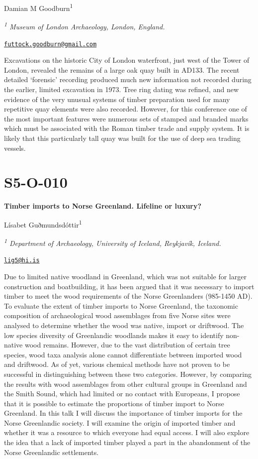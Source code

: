 \documentclass[
]{book}
\begin{document}
Damian M Goodburn\textsuperscript{1}

\emph{\textsuperscript{1} Museum of London Archaeology, London, England.}

\href{mailto:futtock.goodburn@gmail.com}{\nolinkurl{futtock.goodburn@gmail.com}}

Excavations on the historic City of London waterfront, just west of the Tower of London, revealed the remains of a large oak quay built in AD133. The recent detailed `forensic' recording produced much new information not recorded during the earlier, limited excavation in 1973. Tree ring dating was refined, and new evidence of the very unusual systems of timber preparation used for many repetitive quay elements were also recorded. However, for this conference one of the most important features were numerous sets of stamped and branded marks which must be associated with the Roman timber trade and supply system. It is likely that this particularly tall quay was built for the use of deep sea trading vessels.

\hypertarget{s5-o-010}{%
\section*{S5-O-010}\label{s5-o-010}}

\textbf{Timber imports to Norse Greenland. Lifeline or luxury?}

Lísabet Guðmundsdóttir\textsuperscript{1}

\emph{\textsuperscript{1} Department of Archaeology, University of Iceland, Reykjavík, Iceland.}

\href{mailto:lig5@hi.is}{\nolinkurl{lig5@hi.is}}

Due to limited native woodland in Greenland, which was not suitable for larger construction and boatbuilding, it has been argued that it was necessary to import timber to meet the wood requirements of the Norse Greenlanders (985-1450 AD). To evaluate the extent of timber imports to Norse Greenland, the taxonomic composition of archaeological wood assemblages from five Norse sites were analysed to determine whether the wood was native, import or driftwood. The low species diversity of Greenlandic woodlands makes it easy to identify non-native wood remains. However, due to the vast distribution of certain tree species, wood taxa analysis alone cannot differentiate between imported wood and driftwood. As of yet, various chemical methods have not proven to be successful in distinguishing between these two categories. However, by comparing the results with wood assemblages from other cultural groups in Greenland and the Smith Sound, which had limited or no contact with Europeans, I propose that it is possible to estimate the proportions of timber import to Norse Greenland. In this talk I will discuss the importance of timber imports for the Norse Greenlandic society. I will examine the origin of imported timber and whether it was a resource to which everyone had equal access. I will also explore the idea that a lack of imported timber played a part in the abandonment of the Norse Greenlandic settlements.
\end{document}
